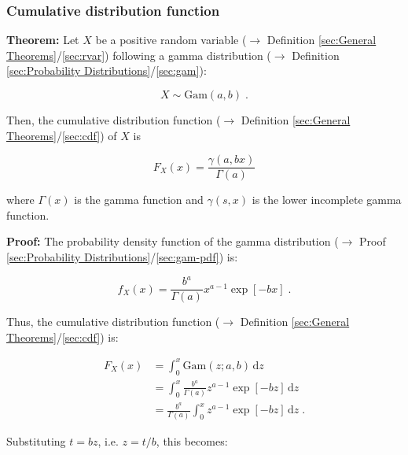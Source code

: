 \documentclass[a4paper,12pt,twoside]{book}
\begin{document}
\subsubsection[\textbf{Cumulative distribution function}]{Cumulative distribution function} \label{sec:gam-cdf}
\setcounter{equation}{0}

\textbf{Theorem:} Let $X$ be a positive random variable ($\rightarrow$ Definition \ref{sec:General Theorems}/\ref{sec:rvar}) following a gamma distribution ($\rightarrow$ Definition \ref{sec:Probability Distributions}/\ref{sec:gam}):

\begin{equation} \label{eq:gam-cdf-gam}
X \sim \mathrm{Gam}(a, b) \; .
\end{equation}

Then, the cumulative distribution function ($\rightarrow$ Definition \ref{sec:General Theorems}/\ref{sec:cdf}) of $X$ is

\begin{equation} \label{eq:gam-cdf-gam-cdf}
F_X(x) = \frac{\gamma(a,bx)}{\Gamma(a)}
\end{equation}

where $\Gamma(x)$ is the gamma function and $\gamma(s,x)$ is the lower incomplete gamma function.


\vspace{1em}
\textbf{Proof:} The probability density function of the gamma distribution ($\rightarrow$ Proof \ref{sec:Probability Distributions}/\ref{sec:gam-pdf}) is:

\begin{equation} \label{eq:gam-cdf-gam-pdf}
f_X(x) = \frac{b^a}{\Gamma(a)} x^{a-1} \exp[-b x] \; .
\end{equation}

Thus, the cumulative distribution function ($\rightarrow$ Definition \ref{sec:General Theorems}/\ref{sec:cdf}) is:

\begin{equation} \label{eq:gam-cdf-gam-cdf-s1}
\begin{split}
F_X(x) &= \int_{0}^{x} \mathrm{Gam}(z; a, b) \, \mathrm{d}z \\
&= \int_{0}^{x} \frac{b^a}{\Gamma(a)} z^{a-1} \exp[-b z] \, \mathrm{d}z \\
&= \frac{b^a}{\Gamma(a)} \int_{0}^{x} z^{a-1} \exp[-b z] \, \mathrm{d}z \; .
\end{split}
\end{equation}

Substituting $t = b z$, i.e. $z = t/b$, this becomes:
\end{document}

